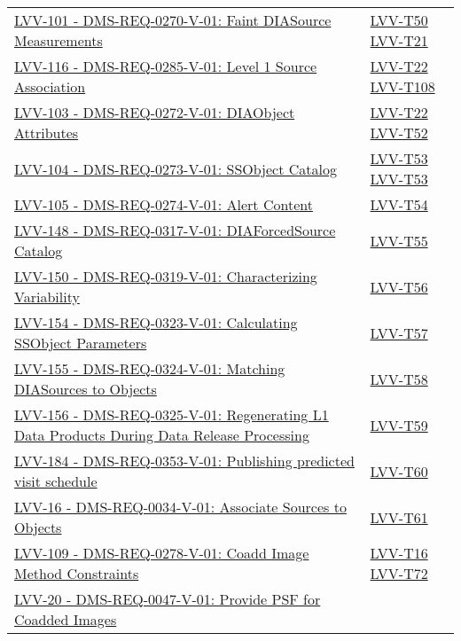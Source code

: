 {\begin{longtable}[]{p{13cm}p{3cm}}
\href{https://jira.lsstcorp.org/browse/LVV-101}{LVV-101 - DMS-REQ-0270-V-01: Faint DIASource Measurements}
& {
\hyperref[lvv-t50]{LVV-T50}
\hyperref[lvv-t21]{LVV-T21}
} \\
\href{https://jira.lsstcorp.org/browse/LVV-116}{LVV-116 - DMS-REQ-0285-V-01: Level 1 Source Association}
& {
\hyperref[lvv-t22]{LVV-T22}
\hyperref[lvv-t108]{LVV-T108}
} \\
\href{https://jira.lsstcorp.org/browse/LVV-103}{LVV-103 - DMS-REQ-0272-V-01: DIAObject Attributes}
& {
\hyperref[lvv-t22]{LVV-T22}
\hyperref[lvv-t52]{LVV-T52}
} \\
\href{https://jira.lsstcorp.org/browse/LVV-104}{LVV-104 - DMS-REQ-0273-V-01: SSObject Catalog}
& {
\hyperref[lvv-t53]{LVV-T53}
\hyperref[lvv-t53]{LVV-T53}
} \\
\href{https://jira.lsstcorp.org/browse/LVV-105}{LVV-105 - DMS-REQ-0274-V-01: Alert Content}
& {
\hyperref[lvv-t54]{LVV-T54}
} \\
\href{https://jira.lsstcorp.org/browse/LVV-148}{LVV-148 - DMS-REQ-0317-V-01: DIAForcedSource Catalog}
& {
\hyperref[lvv-t55]{LVV-T55}
} \\
\href{https://jira.lsstcorp.org/browse/LVV-150}{LVV-150 - DMS-REQ-0319-V-01: Characterizing Variability}
& {
\hyperref[lvv-t56]{LVV-T56}
} \\
\href{https://jira.lsstcorp.org/browse/LVV-154}{LVV-154 - DMS-REQ-0323-V-01: Calculating SSObject Parameters}
& {
\hyperref[lvv-t57]{LVV-T57}
} \\
\href{https://jira.lsstcorp.org/browse/LVV-155}{LVV-155 - DMS-REQ-0324-V-01: Matching DIASources to Objects}
& {
\hyperref[lvv-t58]{LVV-T58}
} \\
\href{https://jira.lsstcorp.org/browse/LVV-156}{LVV-156 - DMS-REQ-0325-V-01: Regenerating L1 Data Products During Data Release Processing}
& {
\hyperref[lvv-t59]{LVV-T59}
} \\
\href{https://jira.lsstcorp.org/browse/LVV-184}{LVV-184 - DMS-REQ-0353-V-01: Publishing predicted visit schedule}
& {
\hyperref[lvv-t60]{LVV-T60}
} \\
\href{https://jira.lsstcorp.org/browse/LVV-16}{LVV-16 - DMS-REQ-0034-V-01: Associate Sources to Objects}
& {
\hyperref[lvv-t61]{LVV-T61}
} \\
\href{https://jira.lsstcorp.org/browse/LVV-109}{LVV-109 - DMS-REQ-0278-V-01: Coadd Image Method Constraints}
& {
\hyperref[lvv-t16]{LVV-T16}
\hyperref[lvv-t72]{LVV-T72}
} \\
\href{https://jira.lsstcorp.org/browse/LVV-20}{LVV-20 - DMS-REQ-0047-V-01: Provide PSF for Coadded Images}

\end{longtable}}
